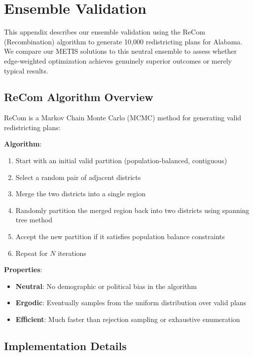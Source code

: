 
\section{Ensemble Validation}
\label{appendix:ensemble}

This appendix describes our ensemble validation using the ReCom (Recombination) algorithm to generate 10,000 redistricting plans for Alabama. We compare our METIS solutions to this neutral ensemble to assess whether edge-weighted optimization achieves genuinely superior outcomes or merely typical results.

\subsection{ReCom Algorithm Overview}

ReCom is a Markov Chain Monte Carlo (MCMC) method for generating valid redistricting plans:

\textbf{Algorithm}:
\begin{enumerate}
    \item Start with an initial valid partition (population-balanced, contiguous)
    \item Select a random pair of adjacent districts
    \item Merge the two districts into a single region
    \item Randomly partition the merged region back into two districts using spanning tree method
    \item Accept the new partition if it satisfies population balance constraints
    \item Repeat for $N$ iterations
\end{enumerate}

\textbf{Properties}:
\begin{itemize}
    \item \textbf{Neutral}: No demographic or political bias in the algorithm
    \item \textbf{Ergodic}: Eventually samples from the uniform distribution over valid plans
    \item \textbf{Efficient}: Much faster than rejection sampling or exhaustive enumeration
\end{itemize}

\subsection{Implementation Details}

